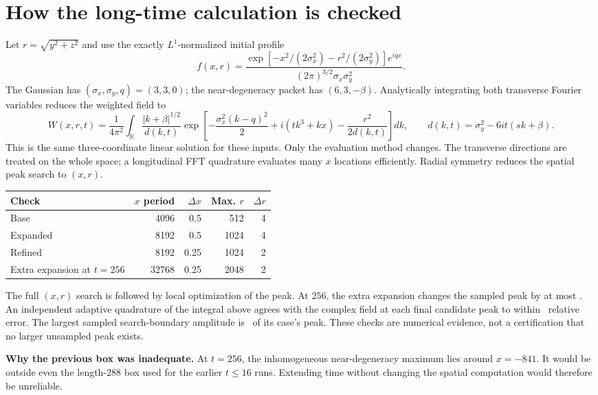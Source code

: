 \documentclass[10pt,letterpaper]{article}
\begin{document}
\section*{How the long-time calculation is checked}
Let $r=\sqrt{y^2+z^2}$ and use the exactly $L^1$-normalized initial profile
\[
 f(x,r)=\frac{\exp[-x^2/(2\sigma_x^2)-r^2/(2\sigma_y^2)]e^{iqx}}
 {(2\pi)^{3/2}\sigma_x\sigma_y^2}.
\]
The Gaussian has $(\sigma_x,\sigma_y,q)=(3,3,0)$; the near-degeneracy packet
has $(6,3,-\beta)$. Analytically integrating both transverse Fourier variables
reduces the weighted field to
\[
 W(x,r,t)=\frac1{4\pi^2}\int_{\mathbb R}
 \frac{|k+\beta|^{1/2}}{d(k,t)}
 \exp\!\left[-\frac{\sigma_x^2(k-q)^2}{2}+i(tk^3+kx)
             -\frac{r^2}{2d(k,t)}\right]dk,
 \qquad d(k,t)=\sigma_y^2-6it(sk+\beta).
\]
This is the same three-coordinate linear solution for these inputs. Only the
evaluation method changes. The transverse directions are treated on the whole
space; a longitudinal FFT quadrature evaluates many $x$ locations efficiently.
Radial symmetry reduces the spatial peak search to $(x,r)$.

\begin{center}\begin{tabular}{lrrrr}\toprule
Check & $x$ period & $\Delta x$ & Max. $r$ & $\Delta r$\\\midrule
Base & 4096 & 0.5 & 512 & 4\\
Expanded & 8192 & 0.5 & 1024 & 4\\
Refined & 8192 & 0.25 & 1024 & 2\\
Extra expansion at $t=256$ & 32768 & 0.25 & 2048 & 2\\\bottomrule
\end{tabular}\end{center}
The full $(x,r)$ search is followed by local optimization of the peak. At $256$,
the extra expansion changes the sampled peak by at most \LongDomain. An independent
adaptive quadrature of the integral above agrees with the complex field at each
final candidate peak to within \LongQuad\ relative error. The largest sampled
search-boundary amplitude is \LongEdge\ of its case's peak. These checks are
numerical evidence, not a certification that no larger unsampled peak exists.

\textbf{Why the previous box was inadequate.} At $t=256$, the inhomogeneous
near-degeneracy maximum lies around $x=-841$. It would be outside even the
length-288 box used for the earlier $t\le16$ runs. Extending time without changing
the spatial computation would therefore be unreliable.
\end{document}
